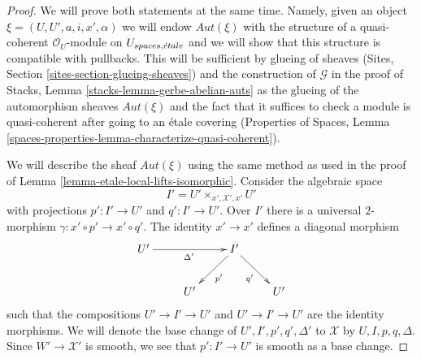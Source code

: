 \begin{proof}
We will prove both statements at the same time. Namely, given
an object $\xi = (U, U', a, i, x', \alpha)$ we will endow
$\mathit{Aut}(\xi)$ with the structure of a
quasi-coherent $\mathcal{O}_U$-module on $U_{spaces, {\acute{e}tale}}$ and
we will show that this structure is compatible with pullbacks.
This will be sufficient by glueing of sheaves
(Sites, Section \ref{sites-section-glueing-sheaves})
and the construction of $\mathcal{G}$ in the proof of
Stacks, Lemma \ref{stacks-lemma-gerbe-abelian-auts}
as the glueing of the automorphism sheaves $\mathit{Aut}(\xi)$
and the fact that it suffices to check a module is
quasi-coherent after going to an \'etale covering
(Properties of Spaces, Lemma
\ref{spaces-properties-lemma-characterize-quasi-coherent}).

\medskip\noindent
We will describe the sheaf $\mathit{Aut}(\xi)$ using the
same method as used in the proof of
Lemma \ref{lemma-etale-local-lifts-isomorphic}.
Consider the algebraic space
$$
I' = U' \times_{x', \mathcal{X}', x'} U'
$$
with projections $p' : I' \to U'$ and $q' : I' \to U'$.
Over $I'$ there is a universal $2$-morphism
$\gamma : x' \circ p' \to x' \circ q'$.
The identity $x' \to x'$ defines a diagonal morphism
$$
\xymatrix{
U' \ar[rr]_{\Delta'} & & I' \ar[ld]^{p'} \ar[rd]_{q'} \\
& U' & & U'
}
$$
such that the compositions $U' \to I' \to U'$ and $U' \to I' \to U'$
are the identity morphisms. We will denote the base change of
$U', I', p', q', \Delta'$ to $\mathcal{X}$ by $U, I, p, q, \Delta$.
Since $W' \to \mathcal{X}'$ is smooth, we see that $p' : I' \to U'$
is smooth as a base change.


\end{proof}
